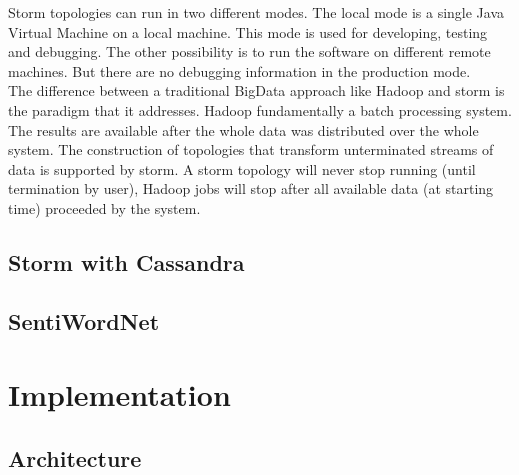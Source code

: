 \documentclass[a4paper]{article}
\begin{document}
Storm topologies can run in two different modes. The local mode is a single Java Virtual Machine on a local machine. This mode is used for developing, testing and debugging. The other possibility is to run the software on different remote machines. But there are no debugging information in the production mode.\\
The difference between a traditional BigData approach like Hadoop and storm is the paradigm that it addresses. Hadoop fundamentally a batch processing system. The results are available after the whole data was distributed over the whole system. The construction of topologies that transform unterminated streams of data is supported by storm. A storm topology will never stop running (until termination by user), Hadoop jobs will stop after all available data (at starting time) proceeded by the system.

\subsection{Storm with Cassandra}
\subsection{SentiWordNet}

\section{Implementation}
\subsection{Architecture}
\end{document}
